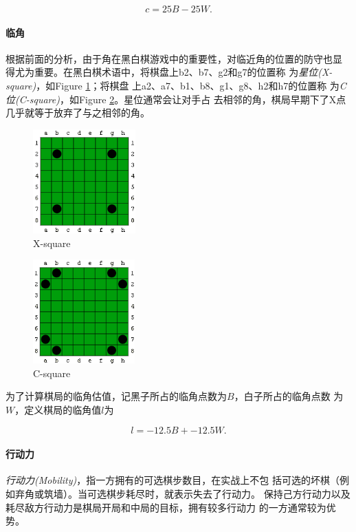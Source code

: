 \documentclass[oneside,a4paper]{article}
\begin{document}
\begin{equation}c = 25B - 25W   \mathrm{ .}
\end{equation}

\paragraph{临角}
根据前面的分析，由于角在黑白棋游戏中的重要性，对临近角的位置的防守也显
得尤为重要。在黑白棋术语中，将棋盘上b2、b7、g2和g7的位置称
为\emph{星位(X-square)}，如Figure \ref{fig:x-square}；将棋盘
上a2、a7、b1、b8、g1、g8、h2和h7的位置称
为\emph{C位(C-square)}，如Figure \ref{fig:c-square}。星位通常会让对手占
去相邻的角，棋局早期下了X点几乎就等于放弃了与之相邻的角。

\begin{figure}[!htbp]
  \centering
  \includegraphics[height=4cm]{x-square.png}
  \caption{X-square}
  \label{fig:x-square}
\end{figure}

\begin{figure}[!htbp]
  \centering
  \includegraphics[height=4cm]{c-square.png}
  \caption{C-square}
  \label{fig:c-square}
\end{figure}

为了计算棋局的临角估值，记黑子所占的临角点数为$B$，白子所占的临角点数
为$W$，定义棋局的临角值$l$为

\begin{equation}l = -12.5B + -12.5W  \mathrm{ .}
\end{equation}

\paragraph{行动力}
\emph{行动力(Mobility)}，指一方拥有的可选棋步数目，在实战上不包
括可选的坏棋（例如弃角或筑墙）。当可选棋步耗尽时，就表示失去了行动力。
保持己方行动力以及耗尽敌方行动力是棋局开局和中局的目标，拥有较多行动力
的一方通常较为优势。
\end{document}
